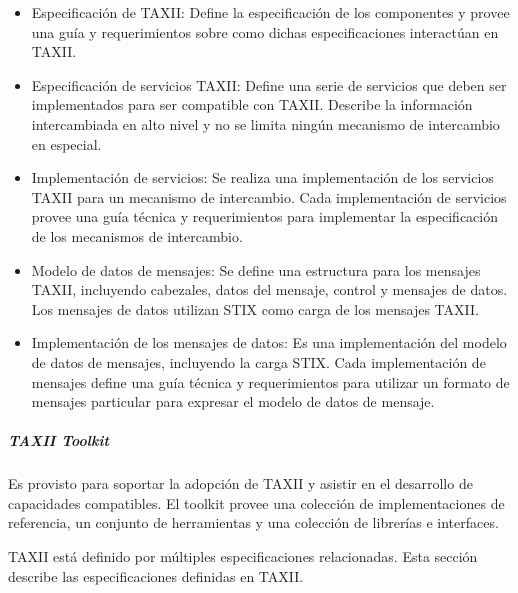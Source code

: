 \begin{itemize}
  \item Especificación de TAXII: Define la especificación de los componentes y 
  provee una guía y requerimientos sobre como dichas especificaciones 
  interactúan en TAXII.
  \item Especificación de servicios TAXII: Define una serie de servicios que 
  deben ser implementados para ser compatible con TAXII. Describe la información 
  intercambiada en alto nivel y no se limita  ningún mecanismo de intercambio en 
  especial.
  \item Implementación de servicios: Se realiza una implementación de los 
  servicios TAXII para un mecanismo de intercambio. Cada implementación de 
  servicios provee una guía técnica y requerimientos para implementar la 
  especificación de los mecanismos de intercambio.
  \item Modelo de datos de mensajes: Se define una estructura para los mensajes 
  TAXII, incluyendo cabezales, datos del mensaje, control y mensajes de datos. 
  Los mensajes de datos utilizan STIX como carga de los mensajes TAXII.
  \item Implementación de los mensajes de datos: Es una implementación del 
  modelo de datos de mensajes, incluyendo la carga STIX. Cada implementación de 
  mensajes define una guía técnica y requerimientos para utilizar un formato de 
  mensajes particular para expresar el modelo de datos de mensaje.
\end{itemize}

\subparagraph{TAXII Toolkit}

Es provisto para soportar la adopción de TAXII y asistir en el desarrollo de 
capacidades compatibles. El toolkit provee una colección de implementaciones de 
referencia, un conjunto de herramientas y una colección de librerías e 
interfaces.

TAXII está definido por múltiples especificaciones relacionadas. Esta sección 
describe las especificaciones definidas en TAXII.

